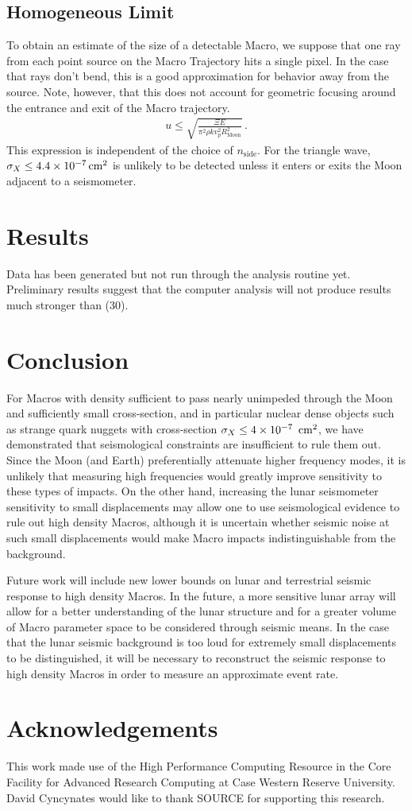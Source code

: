 \documentclass[prd,reprint,10pt]{revtex4-1}
\newcommand*\te[1]{\text{#1}}
\newcommand*\f[2]{\frac{#1}{#2}}
\begin{document}
\subsection{Homogeneous Limit}
To obtain an estimate of the size of a detectable Macro, we suppose that one ray from each point source on the Macro Trajectory hits a single pixel. In the case that rays don't bend, this is a good approximation for behavior away from the source. Note, however, that this does not account for geometric focusing around the entrance and exit of the Macro trajectory.
\begin{align}
u\leq\sqrt{\f{\Xi E}{\pi^2\rho k v_p^2 R_\te{Moon}^2}}\,.
\end{align}
This expression is independent of the choice of $n_\te{side}$. For the triangle wave, $\sigma_X\leq 4.4\times 10^{-7}\te{\,cm}^2$ is unlikely to be detected unless it enters or exits the Moon adjacent to a seismometer.
\section{Results}
Data has been generated but not run through the analysis routine yet. Preliminary results suggest that the computer analysis will not produce results much stronger than (30).
\section{Conclusion}
For Macros with density sufficient to pass nearly unimpeded through the Moon and sufficiently small cross-section, and in particular nuclear dense objects such as strange quark nuggets with cross-section $\sigma_X\leq 4\times 10^{-7}\te{\, cm}^2$, we have demonstrated that seismological constraints are insufficient to rule them out. Since the Moon (and Earth) preferentially attenuate higher frequency modes, it is unlikely that measuring high frequencies would greatly improve sensitivity to these types of impacts. On the other hand, increasing the lunar seismometer sensitivity to small displacements may allow one to use seismological evidence to rule out high density Macros, although it is uncertain whether seismic noise at such small displacements would make Macro impacts indistinguishable from the background.

Future work will include new lower bounds on lunar and terrestrial seismic response to high density Macros. In the future, a more sensitive lunar array will allow for a better understanding of the lunar structure and for a greater volume of Macro parameter space to be considered through seismic means. In the case that the lunar seismic background is too loud for extremely small displacements to be distinguished, it will be necessary to reconstruct the seismic response to high density Macros in order to measure an approximate event rate.
\section{Acknowledgements}
This work made use of the High Performance Computing Resource in the Core Facility for Advanced Research Computing at Case Western Reserve University. David Cyncynates would like to thank SOURCE for supporting this research.
{}

\end{document}
